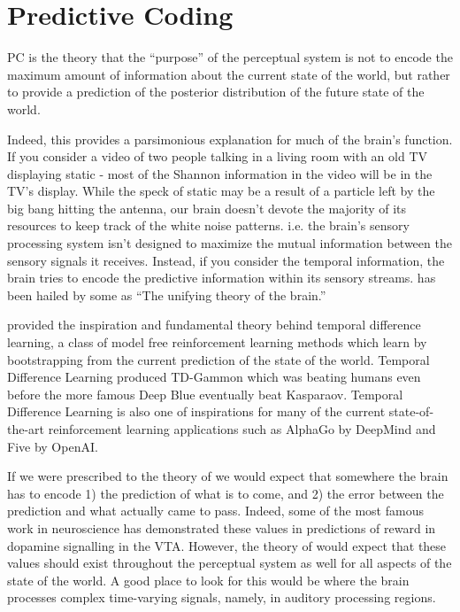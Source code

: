 \chapter{Predictive Coding}

\acf{PC} is the theory that the ``purpose'' of the perceptual system is not to encode the maximum amount of information about the current state of the world, but rather to provide a prediction of the posterior distribution of the future state of the world. 

Indeed, this provides a parsimonious explanation for much of the brain's function. If you consider a video of two people talking in a living room with an old TV displaying static - most of the Shannon information in the video will be in the TV's display. While the speck of static may be a result of a particle left by the big bang hitting the antenna, our brain doesn't devote the majority of its resources to keep track of the white noise patterns. i.e. the brain's sensory processing system isn't designed to maximize the mutual information between the sensory signals it receives. Instead, if you consider the temporal information, the brain tries to encode the predictive information within its sensory streams. \PC has been hailed by some as ``The unifying theory of the brain.''

\PC provided the inspiration and fundamental theory behind temporal difference learning, a class of model free reinforcement learning methods which learn by bootstrapping from the current prediction of the state of the world. Temporal Difference Learning produced TD-Gammon which was beating humans even before the more famous Deep Blue eventually beat Kasparaov. Temporal Difference Learning is also one of inspirations for many of the current state-of-the-art reinforcement learning applications such as AlphaGo by DeepMind and Five by OpenAI.

If we were prescribed to the theory of \PC we would expect that somewhere the brain has to encode 1) the prediction of what is to come, and 2) the error between the prediction and what actually came to pass. Indeed, some of the most famous work in neuroscience has demonstrated these values in predictions of reward in dopamine signalling in the VTA. However, the theory of \PC would expect that these values should exist throughout the perceptual system as well for all aspects of the state of the world. A good place to look for this would be where the brain processes complex time-varying signals, namely, in auditory processing regions.

